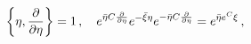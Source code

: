 \begin{equation}
\left\{ \eta ,{\frac{\partial }{\partial \eta }}\right\} =1\,,\quad e^{\bar{%
\eta}C{\frac{\partial }{\partial \eta }}}e^{-\bar{\xi}\eta }e^{-\bar{\eta}C{%
\frac{\partial }{\partial \eta }}}=e^{\bar{\eta}e^{C}\xi }\,,
\end{equation}

